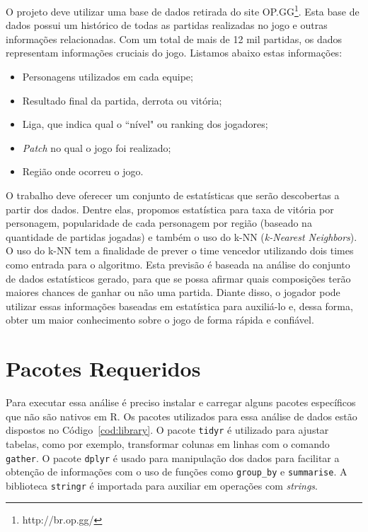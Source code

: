 \documentclass[a4paper]{article}
\begin{document}
O projeto deve utilizar uma base de dados retirada do site OP.GG\footnote{http://br.op.gg/}. Esta base de dados possui um histórico de todas as partidas realizadas no jogo e outras informações relacionadas. Com um total de mais de 12 mil partidas, os dados representam informações cruciais do jogo. Listamos abaixo estas informações: 

\begin{itemize}
	\item Personagens utilizados em cada equipe;
    
	\item Resultado final da partida, derrota ou vitória;
    
    \item Liga, que indica qual o ``nível" ou ranking dos jogadores;
    
    \item \textit{Patch} no qual o jogo foi realizado;
    
    \item Região onde ocorreu o jogo.
\end{itemize}  


O trabalho deve oferecer um conjunto de estatísticas que serão descobertas a partir dos dados. Dentre elas, propomos estatística para taxa de vitória por personagem, popularidade de cada personagem por região (baseado na quantidade de partidas jogadas) e também o uso do k-NN (\textit{k-Nearest Neighbors}). O uso do k-NN tem a finalidade de prever o time vencedor utilizando dois times como entrada para o algoritmo. Esta previsão é baseada na análise do conjunto de dados estatísticos gerado, para que se possa afirmar quais composições terão maiores chances de ganhar ou não uma partida. Diante disso, o jogador pode utilizar essas informações baseadas em estatística para auxiliá-lo e, dessa forma, obter um maior conhecimento sobre o jogo de forma rápida e confiável.

\section{Pacotes Requeridos}

Para executar essa análise é preciso instalar e carregar alguns pacotes específicos que não são nativos em R. Os pacotes utilizados para essa análise de dados estão dispostos no Código~\ref{cod:library}. O pacote \texttt{tidyr} é utilizado para ajustar tabelas, como por exemplo, transformar colunas em linhas com o comando \texttt{gather}. O pacote \texttt{dplyr} é usado para manipulação dos dados para facilitar a obtenção de informações com o uso de funções como \texttt{group\_by} e \texttt{summarise}. A biblioteca \texttt{stringr} é importada para auxiliar em operações com \textit{strings}.
\end{document}
